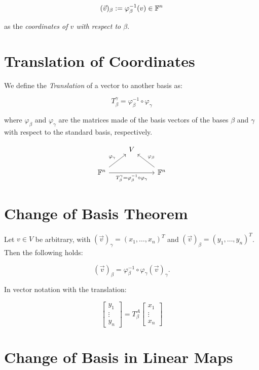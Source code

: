 \[
    (\vec{v})_\beta := \varphi_\beta^{-1} (v) \in \mathbb{F}^n
\]

as the \emph{coordinates of \( v \) with respect to \(\beta\)}.

\section{Translation of Coordinates}

We define the \emph{Translation} of a vector to another basis as:

\[
    T_{\beta}^{\gamma} = \varphi_{\beta}^{-1} \circ \varphi_\gamma
\]

where \(\varphi_\beta\) and \(\varphi_\gamma\) are the matrices made of the basis vectors of the bases \(\beta\) and \(\gamma\) with respect
to the standard basis, respectively.

\[
    \begin{tikzcd}
        & V & \\
        \field^n \arrow[ur, "\varphi_\gamma"] \arrow[rr, "T_{\beta}^{\gamma} = \varphi_\beta^{-1} \circ \varphi_\gamma"'] & & \field^n \arrow[ul, "\varphi_\beta"']
    \end{tikzcd}
\]

\section{Change of Basis Theorem}

Let \( v \in V \) be arbitrary, with \( (\vec{v})_\gamma = {(x_1, \dots, x_n)}^T \)
and \( (\vec{v})_\beta = {(y_1, \dots, y_n)}^T \).  Then the following holds:

\[
    (\vec{v})_\beta =  \varphi_\beta^{-1} \circ \varphi_\gamma (\vec{v})_\gamma.
\]

In vector notation with the translation:

\[
    \begin{bmatrix}
        y_1    \\
        \vdots \\
        y_n
    \end{bmatrix}
    =
    T_\beta^A
    \begin{bmatrix}
        x_1    \\
        \vdots \\
        x_n
    \end{bmatrix}
\]

\section{Change of Basis in Linear Maps}

